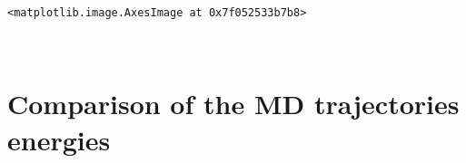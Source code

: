 \documentclass[11pt]{article}
\makeatletter
\newcommand{\boxspacing}{\kern\kvtcb@left@rule\kern\kvtcb@boxsep}
\newcommand{\prompt}[4]{
        \ttfamily\llap{{\color{#2}[#3]:\hspace{3pt}#4}}\vspace{-\baselineskip}
    }
\makeatother
\begin{document}
            \begin{tcolorbox}[breakable, size=fbox, boxrule=.5pt, pad at break*=1mm, opacityfill=0]
\prompt{Out}{outcolor}{24}{\boxspacing}
\begin{Verbatim}[commandchars=\\\{\}]
<matplotlib.image.AxesImage at 0x7f052533b7b8>
\end{Verbatim}
\end{tcolorbox}
        
    \begin{center}
    \end{center}
    { \hspace*{\fill} \\}
    
    \section{Comparison of the MD trajectories
energies}\label{comparison-of-the-md-trajectories-energies}
\end{document}
